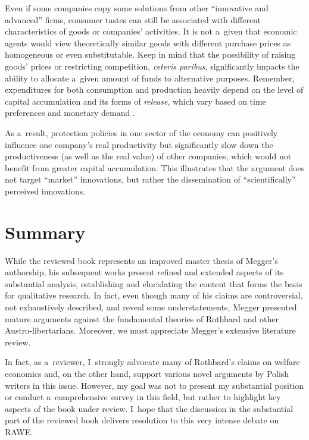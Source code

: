 Even if some companies copy some solutions from other ``innovative and advanced'' firms, consumer tastes can still be associated with different characteristics of goods or companies' activities. It is not a~given that economic agents would view theoretically similar goods with different purchase prices as homogeneous or even substitutable. Keep in mind that the possibility of raising goods' prices or restricting competition, \textit{ceteris paribus}, significantly impacts the ability to allocate a~given amount of funds to alternative purposes. Remember, expenditures for both consumption and production heavily depend on the level of capital accumulation and its forms of \textit{release}, which vary based on time preferences and monetary demand 
\parencite[][pp.348–362]{}.%




As a~result, protection policies in one sector of the economy can positively influence one company's real productivity but significantly slow down the productiveness (as well as the real value) of other companies, which would not benefit from greater capital accumulation. This illustrates that the argument does not target ``market'' innovations, but rather the dissemination of ``scientifically'' perceived innovations.



\section{Summary}

While the reviewed book represents an improved master thesis of Megger's authorship, his subsequent works present refined and extended aspects of its substantial analysis, establishing and elucidating the content that forms the basis for qualitative research. In fact, even though many of his claims are controversial, not exhaustively described, and reveal some understatements, Megger presented mature arguments against the fundamental theories of Rothbard and other Austro-libertarians. Moreover, we must appreciate Megger's extensive literature review.



In fact, as a~reviewer, I~strongly advocate many of Rothbard's claims on welfare economics and, on the other hand, support various novel arguments by Polish writers in this issue. However, my goal was not to present my substantial position or conduct a~comprehensive survey in this field, but rather to highlight key aspects of the book under review. I~hope that the discussion in the substantial part of the reviewed book delivers resolution to this very intense debate on RAWE.



